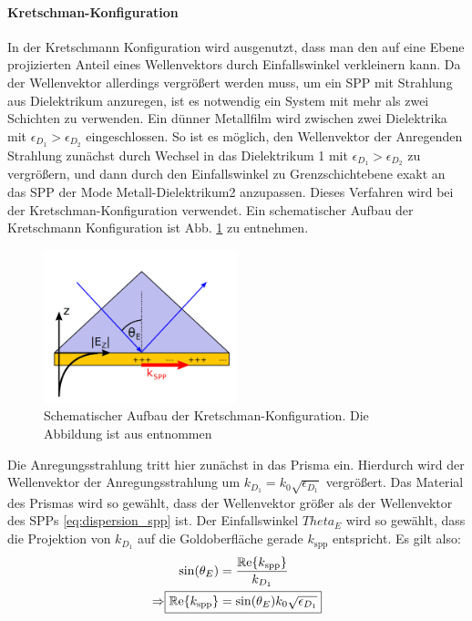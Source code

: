 \documentclass{article}
\begin{document}
			\paragraph{Kretschman-Konfiguration}
			In der Kretschmann Konfiguration wird ausgenutzt, dass man den auf eine Ebene projizierten Anteil eines Wellenvektors durch Einfallswinkel verkleinern kann. Da der Wellenvektor allerdings vergrößert werden muss, um ein SPP mit Strahlung aus Dielektrikum anzuregen, ist es notwendig ein System mit mehr als zwei Schichten zu verwenden. Ein dünner Metallfilm wird zwischen zwei Dielektrika mit $\epsilon_{D_1} > \epsilon_{D_2}$ eingeschlossen. So ist es möglich, den Wellenvektor der Anregenden Strahlung zunächst durch Wechsel in das Dielektrikum 1 mit $\epsilon_{D_1} > \epsilon_{D_2}$ zu vergrößern, und dann durch den Einfallswinkel zu Grenzschichtebene exakt an das SPP der Mode Metall-Dielektrikum2 anzupassen. Dieses Verfahren wird bei der Kretschman-Konfiguration verwendet. Ein schematischer Aufbau der Kretschmann Konfiguration ist Abb. \ref{fig:kretschman} zu entnehmen.
				\begin{figure}[h] 
				\centering
				\includegraphics[width=0.5\textwidth]{figures/kretschman.png}
				\caption{Schematischer Aufbau der Kretschman-Konfiguration. Die Abbildung ist aus \cite{Jaruschewski.2020} entnommen}
				\label{fig:kretschman}
			\end{figure}
			Die Anregungsstrahlung tritt hier zunächst in das Prisma ein. Hierdurch wird der Wellenvektor der Anregungsstrahlung um $k_{D_1}=k_0\sqrt{\epsilon_{D_1}}$ vergrößert. Das Material des Prismas wird so gewählt, dass der Wellenvektor größer als der Wellenvektor des SPPs \eqref{eq:dispersion_spp} ist. Der Einfallswinkel $Theta_E$ wird so gewählt, dass die Projektion von $k_{D_1}$ auf die Goldoberfläche gerade $k_{\mathrm{spp}}$ entspricht. Es gilt also:
			\begin{align}
				\label{eq:phase_condition}
				\sin(\theta_E) &= \dfrac{\operatorname{\mathbb{R}e}\{k_{\mathrm{spp}}\}}{k_{D_1}}\\
				\Rightarrow \Aboxed{\operatorname{\mathbb{R}e}\{k_{\mathrm{spp}}\} &= \sin(\theta_E) k_0 \sqrt{\epsilon_{D_1}}}
			\end{align}
\end{document}
